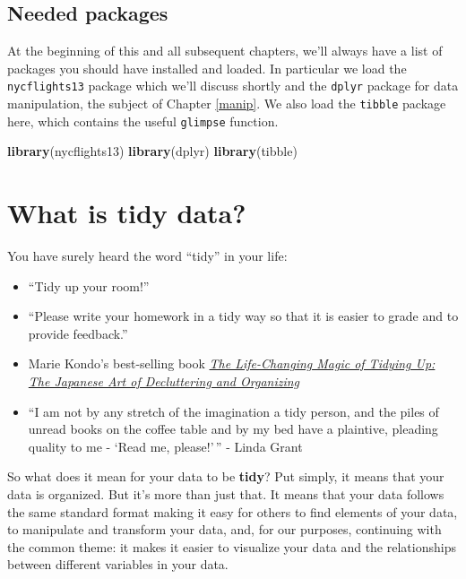 \documentclass[]{tufte-book}
\newenvironment{Shaded}{\begin{snugshade}}{\end{snugshade}}
\newcommand{\KeywordTok}[1]{\textcolor[rgb]{0.13,0.29,0.53}{\textbf{{#1}}}}
\newcommand{\NormalTok}[1]{{#1}}
\providecommand{\tightlist}{%
  \setlength{\itemsep}{0pt}\setlength{\parskip}{0pt}}
\theoremstyle{definition}
\theoremstyle{definition}
\theoremstyle{remark}
\begin{document}
\subsection*{Needed packages}\label{needed-packages}

At the beginning of this and all subsequent chapters, we'll always have
a list of packages you should have installed and loaded. In particular
we load the \texttt{nycflights13} package which we'll discuss shortly
and the \texttt{dplyr} package for data manipulation, the subject of
Chapter \ref{manip}. We also load the \texttt{tibble} package here,
which contains the useful \texttt{glimpse} function.

\begin{Shaded}
\begin{Highlighting}[]
\KeywordTok{library}\NormalTok{(nycflights13)}
\KeywordTok{library}\NormalTok{(dplyr)}
\KeywordTok{library}\NormalTok{(tibble)}
\end{Highlighting}
\end{Shaded}

\section{What is tidy data?}\label{what-is-tidy-data}

You have surely heard the word ``tidy'' in your life:

\begin{itemize}
\tightlist
\item
  ``Tidy up your room!''
\item
  ``Please write your homework in a tidy way so that it is easier to
  grade and to provide feedback.''
\item
  Marie Kondo's best-selling book
  \href{https://www.amazon.com/Life-Changing-Magic-Tidying-Decluttering-Organizing/dp/1607747308/ref=sr_1_1?ie=UTF8\&qid=1469400636\&sr=8-1\&keywords=tidying+up}{\emph{The
  Life-Changing Magic of Tidying Up: The Japanese Art of Decluttering
  and Organizing}}
\item
  ``I am not by any stretch of the imagination a tidy person, and the
  piles of unread books on the coffee table and by my bed have a
  plaintive, pleading quality to me - `Read me, please!'\,'' - Linda
  Grant
\end{itemize}

So what does it mean for your data to be \textbf{tidy}? Put simply, it
means that your data is organized. But it's more than just that. It
means that your data follows the same standard format making it easy for
others to find elements of your data, to manipulate and transform your
data, and, for our purposes, continuing with the common theme: it makes
it easier to visualize your data and the relationships between different
variables in your data.
\end{document}
